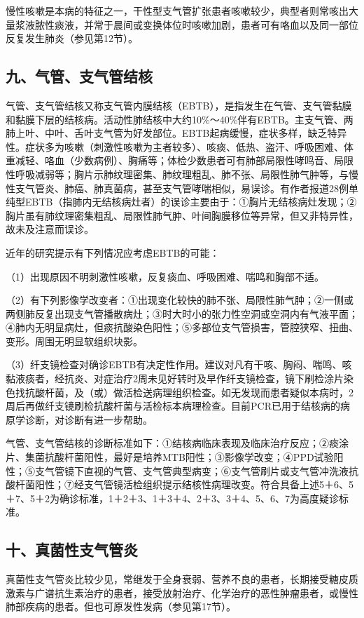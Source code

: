 慢性咳嗽是本病的特征之一，干性型支气管扩张患者咳嗽较少，典型者则常咳出大量浆液脓性痰液，并常于晨间或变换体位时咳嗽加剧，患者可有咯血以及同一部位反复发生肺炎（参见第12节）。

\subsection{九、气管、支气管结核}

气管、支气管结核又称支气管内膜结核（EBTB），是指发生在气管、支气管黏膜和黏膜下层的结核病。活动性肺结核中大约10\%～40\%伴有EBTB。主支气管、两肺上叶、中叶、舌叶支气管为好发部位。EBTB起病缓慢，症状多样，缺乏特异性。症状多为咳嗽（刺激性咳嗽为主者较多）、咳痰、低热、盗汗、呼吸困难、体重减轻、咯血（少数病例）、胸痛等；体检少数患者可有肺部局限性哮鸣音、局限性呼吸减弱等；胸片示肺纹理密集、肺纹理粗乱、肺不张、局限性肺气肿等，与慢性支气管炎、肺癌、肺真菌病，甚至支气管哮喘相似，易误诊。有作者报道28例单纯型EBTB（指肺内无结核病灶者）的误诊主要由于：①胸片无结核病灶发现；②胸片虽有肺纹理密集粗乱、局限性肺气肿、叶间胸膜移位等异常，但又非特异性，故未及注意而误诊。

近年的研究提示有下列情况应考虑EBTB的可能：

（1）出现原因不明刺激性咳嗽，反复痰血、呼吸困难、喘鸣和胸部不适。

（2）有下列影像学改变者：①出现变化较快的肺不张、局限性肺气肿；②一侧或两侧肺反复出现支气管播散病灶；③时大时小的张力性空洞或空洞内有气液平面；④肺内无明显病灶，但痰抗酸染色阳性；⑤多部位支气管损害，管腔狭窄、扭曲、变形。周围无明显软组织块影。

（3）纤支镜检查对确诊EBTB有决定性作用。建议对凡有干咳、胸闷、喘鸣、咳黏液痰者，经抗炎、对症治疗2周未见好转时及早作纤支镜检查，镜下刷检涂片染色找抗酸杆菌，及（或）做活检送病理组织检查。如无发现而患者疑似本病时，2周后再做纤支镜刷检抗酸杆菌与活检标本病理检查。目前PCR已用于结核病的病原学诊断，对诊断有进一步帮助。

气管、支气管结核的诊断标准如下：①结核病临床表现及临床治疗反应；②痰涂片、集菌抗酸杆菌阳性，最好是培养MTB阳性；③影像学改变；④PPD试验阳性；⑤支气管镜下直视的气管、支气管典型病变；⑥支气管刷片或支气管冲洗液抗酸杆菌阳性；⑦经支气管镜活检组织提示结核性病理改变。符合具备上述5＋6、5＋7、5＋2为确诊标准，1＋2＋3、1＋3＋4、2＋3、3＋4、5、6、7为高度疑诊标准。

\subsection{十、真菌性支气管炎}

真菌性支气管炎比较少见，常继发于全身衰弱、营养不良的患者，长期接受糖皮质激素与广谱抗生素治疗的患者，接受放射治疗、化学治疗的恶性肿瘤患者，或慢性肺部疾病的患者。但也可原发性发病（参见第17节）。

